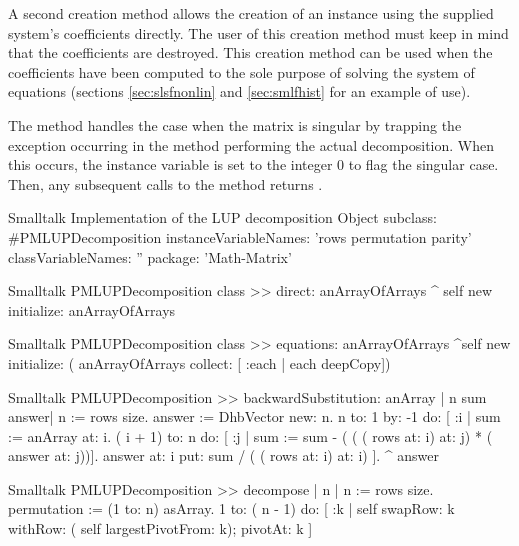 A second creation method  allows the creation of an
instance using the supplied system's coefficients directly. The
user of this creation method must keep in mind that the
coefficients are destroyed. This creation method can be used when
the coefficients have been computed to the sole purpose of solving
the system of equations (\cf sections \ref{sec:slsfnonlin} and
\ref{sec:smlfhist} for an example of use).

The method  handles the case when the
matrix is singular by trapping the exception occurring in the
method  performing the actual decomposition. When
this occurs, the instance variable  is set to the
integer 0 to flag the singular case. Then, any subsequent calls to
the method  returns .

\begin{listing}[label=lst:lup]{Smalltalk}
{Implementation of the LUP decomposition}
Object subclass: #PMLUPDecomposition
   instanceVariableNames: 'rows permutation parity'
   classVariableNames: ''
   package: 'Math-Matrix'
\end{listing}

\begin{displaycode}{Smalltalk}
PMLUPDecomposition class >> direct: anArrayOfArrays
    ^ self new initialize: anArrayOfArrays
\end{displaycode}

\begin{displaycode}{Smalltalk}
PMLUPDecomposition class >>  equations: anArrayOfArrays
        ^self new initialize: ( anArrayOfArrays collect: [ :each | 
                                                      each deepCopy])
\end{displaycode}

\begin{displaycode}{Smalltalk}
PMLUPDecomposition >> backwardSubstitution: anArray
    | n sum answer|
    n := rows size.
    answer := DhbVector new: n.
    n to: 1 by: -1 do:
        [ :i |
          sum := anArray at: i.
          ( i + 1) to: n do: [ :j | sum := sum - ( ( ( rows at: i) 
                                           at: j) * ( answer at: j))].
          answer at: i put: sum / ( ( rows at: i) at: i) ].
    ^ answer
\end{displaycode}

\begin{displaycode}{Smalltalk}
PMLUPDecomposition >> decompose
    | n |
    n := rows size.
    permutation := (1 to: n) asArray.
    1 to: ( n - 1) do:
        [ :k |
          self swapRow: k withRow: ( self largestPivotFrom: k);
               pivotAt: k ]
\end{displaycode}

